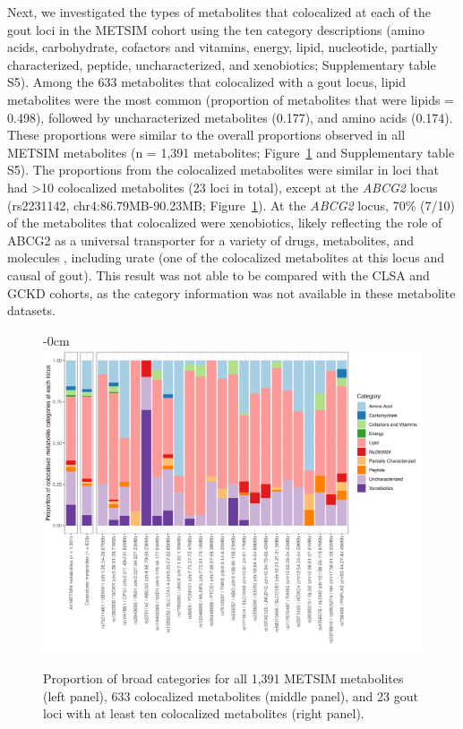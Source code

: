 \documentclass[gucdd,article,submit,pdftex,moreauthors]{Definitions/mdpi}
\begin{document}
Next, we investigated the types of metabolites that colocalized at each of the gout loci in the METSIM cohort using the ten category descriptions (amino acids, carbohydrate, cofactors and vitamins, energy, lipid, nucleotide, partially characterized, peptide, uncharacterized, and xenobiotics; Supplementary table S5).
Among the 633 metabolites that colocalized with a gout locus, lipid metabolites were the most common (proportion of metabolites that were lipids = 0.498), followed by uncharacterized metabolites (0.177), and amino acids (0.174).
These proportions were similar to the overall proportions observed in all METSIM metabolites (n = 1,391 metabolites; Figure~\ref{fig:metsim_category} and Supplementary table S5).
The proportions from the colocalized metabolites were similar in loci that had >10 colocalized metabolites (23 loci in total), except at the \textit{ABCG2} locus (rs2231142, chr4:86.79MB-90.23MB; Figure~\ref{fig:metsim_category}).
At the \textit{ABCG2} locus, 70\% (7/10) of the metabolites that colocalized were xenobiotics, likely reflecting the role of ABCG2 as a universal transporter for a variety of drugs, metabolites, and molecules \citep{austin_doyle_multidrug_2003}, including urate (one of the colocalized metabolites at this locus and causal of gout).
This result was not able to be compared with the CLSA and GCKD cohorts, as the category information was not available in these metabolite datasets.

\begin{figure}
	\centering
	\begin{adjustwidth}{-\extralength}{0cm}
		\includegraphics[width=1.4\textwidth]{"./metsim_category_prop.stacked.total.png"}
		\caption{Proportion of broad categories for all 1,391 METSIM metabolites (left panel), 633 colocalized metabolites (middle panel), and 23 gout loci with at least ten colocalized metabolites (right panel).}
		\label{fig:metsim_category}
	\end{adjustwidth}
\end{figure}
\end{document}
